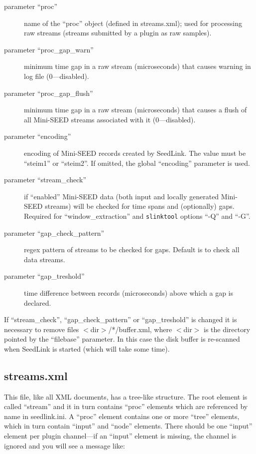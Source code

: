 \documentclass[11pt,a4paper,titlepage]{article}
\begin{document}
\begin{description}
\begin{description}
\item[parameter ``proc''] name of the ``proc'' object (defined in
streams.xml); used for processing raw streams (streams submitted by a
plugin as raw samples).

\item[parameter ``proc\_gap\_warn''] minimum time gap in a raw stream
(microseconds) that causes warning in log file (0---disabled).

\item[parameter ``proc\_gap\_flush''] minimum time gap in a raw stream
(microseconds) that causes a flush of all Mini-SEED streams associated
with it (0---disabled).

\item[parameter ``encoding''] encoding of Mini-SEED records created by
SeedLink. The value must be ``steim1'' or ``steim2''. If omitted, the
global ``encoding'' parameter is used.

\item[parameter ``stream\_check''] if ``enabled'' Mini-SEED data (both
input and locally generated Mini-SEED streams) will be checked for time
spans and (optionally) gaps. Required for ``window\_extraction'' and
\verb+slinktool+ options ``-Q'' and ``-G''.

\item[parameter ``gap\_check\_pattern''] regex pattern of streams to be
checked for gaps. Default is to check all data streams.

\item[parameter ``gap\_treshold''] time difference between records
(microseconds) above which a gap is declared.
\end{description}

\end{description}

If ``stream\_check'', ``gap\_check\_pattern'' or ``gap\_treshold'' is
changed it is necessary to remove files $<$dir$>$/*/buffer.xml, where
$<$dir$>$ is the directory pointed by the ``filebase'' parameter. In this
case the disk buffer is re-scanned when SeedLink is started (which will
take some time).


\subsection{streams.xml}\label{streamsxml}

This file, like all XML documents, has a tree-like structure. The root
element is called ``stream'' and it in turn contains ``proc'' elements
which are referenced by name in seedlink.ini. A ``proc'' element contains
one or more ``tree'' elements, which in turn contain ``input'' and ``node''
elements. There should be one ``input'' element per plugin channel---if an
``input'' element is missing, the channel is ignored and you will see a
message like:
\end{document}
